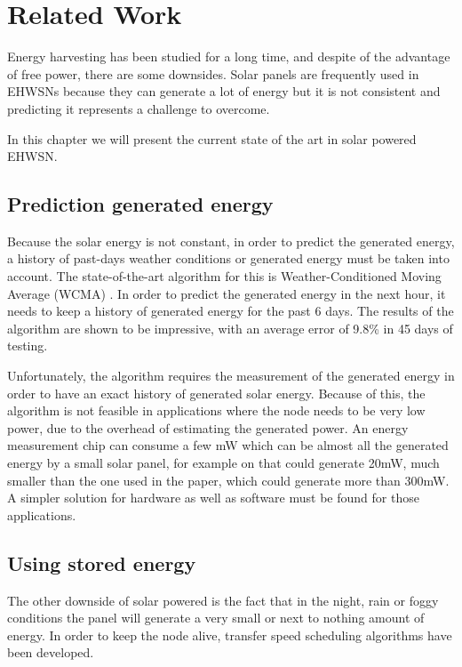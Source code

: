 \normalfont\normalsize
\chapter{Related Work}
\label{chap:related}

Energy harvesting has been studied for a long time, and despite of the advantage of free power,
there are some downsides. Solar panels are frequently used in EHWSNs because they can generate a
lot of energy but it is not consistent and predicting it represents a challenge to overcome.

In this chapter we will present the current state of the art in solar powered EHWSN.

\section {Prediction generated energy}

Because the solar energy is not constant, in order to predict the generated energy, a history of
past-days weather conditions or generated energy must be taken into account. The state-of-the-art
algorithm for this is Weather-Conditioned Moving Average (WCMA) \cite{piorno2009prediction}. In
order to predict the generated energy in the next hour, it needs to keep a history of generated
energy for the past 6 days. The results of the algorithm are shown to be impressive, with an average error of
9.8\% in 45 days of testing.

Unfortunately, the algorithm requires the measurement of the generated energy in order to have an
exact history of generated solar energy. Because of this, the algorithm is not feasible in
applications where the node needs to be very low power, due to the overhead of estimating the
generated power. An energy measurement chip can consume a few mW which can be almost all the generated
energy by a small solar panel, for example on that could generate 20mW, much smaller than the one
used in the paper, which could generate more than 300mW.
A simpler solution for hardware as well as software must be found for those applications.


\section {Using stored energy}
The other downside of solar powered is the fact that in the night, rain or foggy conditions the
panel will generate a very small or next to nothing amount of energy. In order to keep the node
alive, transfer speed scheduling algorithms have been developed.

